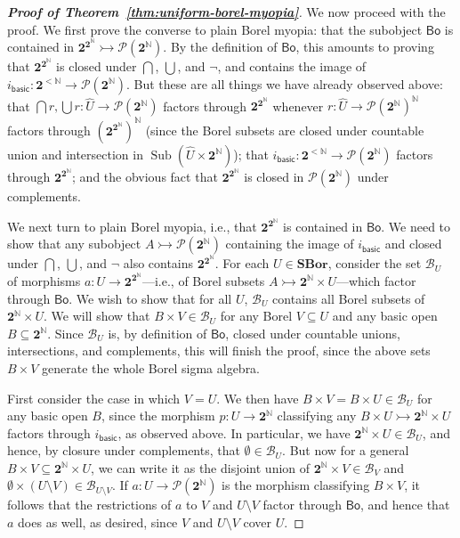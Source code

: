 \documentclass[11pt]{amsart}
\newcommand\basic{\mathsf{basic}}
\newcommand\Bo{\mathsf{Bo}}
\newcommand\cB{\mathcal{B}}
\newcommand{\N}{\mathbb{N}}
\newcommand\pow{\mathcal{P}}
\newcommand\SBor{\mathbf{SBor}}
\newcommand\Sub{\operatorname{Sub}}
\newcommand\tto{\rightarrowtail}
\newcommand\two{\mathbf{2}}
\newcommand\wh[1]{\widehat{#1}}
\theoremstyle{definition}
\theoremstyle{remark}
\theoremstyle{plain}
\begin{document}
\begin{proof}[\textbf{\textup{Proof of Theorem~\ref{thm:uniform-borel-myopia}}}]
  We now proceed with the proof.
  We first prove the converse to plain Borel myopia: that the subobject \( \Bo \) is contained in \( \two^{\two^\N} \tto \pow(\two^\N) \).
  By the definition of \( \Bo \), this amounts to proving that \( \two^{\two^\N} \) is closed under \( \bigcap \), \( \bigcup \), and \( \neg \), and contains the image of \( i_{\basic} \colon \two^{<\N} \to \pow(\two^\N) \).
  But these are all things we have already observed above: that \( \bigcap r,\bigcup r \colon \wh U \to \pow(\two^\N) \) factors through \( \two^{\two^\N} \) whenever \( r \colon \wh U \to \pow(\two^\N)^\N \) factors through \( (\two^{\two^\N})^\N \) (since the Borel subsets are closed under countable union and intersection in \( \Sub(\wh U \times \two^\N) \)); that \( i_{\basic} \colon \two^{<\N} \to \pow(\two^\N) \) factors through \( \two^{\two^\N} \); and the obvious fact that \( \two^{\two^\N} \) is closed in \( \pow(\two^\N) \) under complements.

  We next turn to plain Borel myopia, i.e., that \( \two^{\two^\N} \) is contained in \( \Bo \).
  We need to show that any subobject \( A \tto \pow(\two^\N) \) containing the image of \( i_\basic \) and closed under \( \bigcap \), \( \bigcup \), and \( \neg \) also contains \( \two^{\two^\N} \).
  For each \( U \in \SBor \), consider the set \( \cB_U \) of morphisms \( a \colon U \to \two^{\two^\N} \)---i.e., of Borel subsets \( A \tto \two^\N \times U \)---which factor through \( \Bo \).
  We wish to show that for all \( U \), \( \cB_U \) contains all Borel subsets of \( \two^\N \times U \).
  We will show that \( B \times V \in \cB_U \) for any Borel \( V \subseteq U \) and any basic open \( B \subseteq \two^\N \).
  Since \( \cB_U \) is, by definition of \( \Bo \), closed under countable unions, intersections, and complements, this will finish the proof, since the above sets \( B \times V \) generate the whole Borel sigma algebra.

  First consider the case in which \( V = U \).
  We then have \( B \times V = B \times U \in \cB_U \) for any basic open \( B \), since the morphism \( p \colon U \to \two^\N \) classifying any \( B \times U \tto \two^\N \times U \) factors through \( i_{\basic} \), as observed above.
  In particular, we have \( \two^\N \times U \in \cB_U \), and hence, by closure under complements, that \( \emptyset \in \cB_U \).
  But now for a general \( B \times V \subseteq \two^\N \times U \), we can write it as the disjoint union of \( \two^\N \times V \in \cB_{V} \) and \( \emptyset \times (U \setminus V) \in \cB_{U \setminus V} \).
  If \( a \colon U \to \pow(\two^\N) \) is the morphism classifying \( B \times V \), it follows that the restrictions of \( a \) to \( V \) and \( U \setminus V \) factor through \( \Bo \), and hence that \( a \) does as well, as desired, since \( V \) and \( U \setminus V \) cover \( U. \)


\end{proof}
\end{document}
